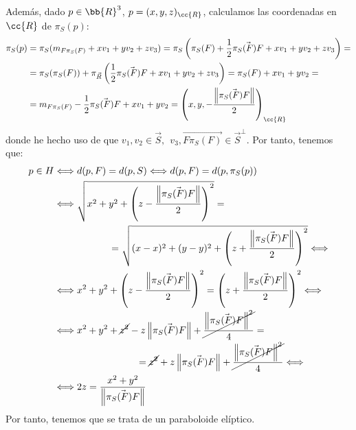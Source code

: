 \begin{ejercicio}
    Además, dado $ p\in \bb{R}^3$, $p=(x,y,z)_{\cc{R}}$, calculamos las coordenadas en $\cc{R}$ de $\pi_S(p)$:
    \begin{align*}
        \pi_S(p) &= \pi_S(m_{F\pi_S(F)} + xv_1 + yv_2+zv_3) = \pi_S\left(\pi_S(F) + \frac{1}{2}\vec{\pi_S(F)F} + xv_1 + yv_2+zv_3\right)
        =\\&= \pi_S(\pi_S(F)) + \pi_{\vec{R}}\left(\frac{1}{2}\vec{\pi_S(F)F} + xv_1 + yv_2+zv_3\right) = \pi_S(F) + xv_1 + yv_2
        =\\&= m_{F\pi_S(F)} -\frac{1}{2}\vec{\pi_S(F)F} + xv_1 + yv_2
        = \left(x,y, -\dfrac{\left\|\vec{\pi_S(F)F}\right\|}{2}\right)_{\cc{R}}
    \end{align*}
    donde he hecho uso de que $v_1,v_2\in \vec{S},~~v_3, \vec{F\pi_S(F)} \in \vec{S}^\perp$. Por tanto, tenemos que:
    \begin{align*}
        p\in H &\Longleftrightarrow
        d(p,F) = d(p,S) \Longleftrightarrow d(p, F) = d(p,\pi_S(p)) \\ & \Longleftrightarrow
        \sqrt{x^2 +y^2+ \left(z-\frac{\left\|\vec{\pi_S(F)F}\right\|}{2}\right)^2} =\\&\hspace{2cm}=\sqrt{(x-x)^2 +(y-y)^2 + \left(z+\frac{\left\|\vec{\pi_S(F)F}\right\|}{2}\right)^2} \Longleftrightarrow \\ & \Longleftrightarrow
        x^2+y^2 + \left(z-\frac{\left\|\vec{\pi_S(F)F}\right\|}{2}\right)^2 = \left(z+\frac{\left\|\vec{\pi_S(F)F}\right\|}{2}\right)^2 \Longleftrightarrow \\ & \Longleftrightarrow
        x^2 +y^2 +\cancel{z^2} - z\left\|\vec{\pi_S(F)F}\right\| + \cancel{\frac{\left\|\vec{\pi_S(F)F}\right\|^2}{4}} =\\&\hspace{3cm}=\cancel{z^2} + z\left\|\vec{\pi_S(F)F}\right\| + \cancel{\frac{\left\|\vec{\pi_S(F)F}\right\|^2}{4}} \Longleftrightarrow \\ & \Longleftrightarrow
        2z = \frac{x^2+y^2}{\left\|\vec{\pi_S(F)F}\right\|}
    \end{align*}
    Por tanto, tenemos que se trata de un paraboloide elíptico.\\



\end{ejercicio}
